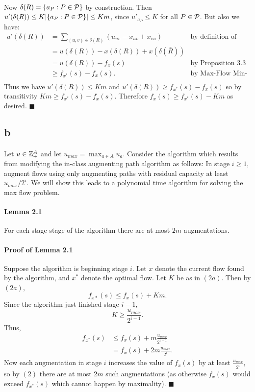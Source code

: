 \documentclass[letterpaper,12pt,oneside,onecolumn]{article}
\begin{document}
\paragraph{}
Now $\delta(R) = \{a_P : P \in \mathcal{P} \}$ by construction. Then $u'(\delta(R)) \leq K|\{a_P : P \in \mathcal{P} \}| \leq Km$, since $u'_{a_P} \leq K$ for all $P \in \mathcal{P}$. But also we have:
\begin{align*}
u'(\delta(R)) &= \sum_{(u,v) \in \delta(R)} (u_{uv} - x_{uv} + x_{vu}) &\text{by definition of residual capacity}\\
&= u(\delta(R)) - x(\delta(R)) + x(\delta(\bar{R})) \\
&= u(\delta(R)) - f_x(s) &\text{by Proposition $3.3$} \\
&\geq f_{x^*}(s) - f_x(s). &\text{by Max-Flow Min-Cut} \\
\end{align*}
Thus we have $u'(\delta(R)) \leq Km$ and $u'(\delta(R)) \geq f_{x^*}(s) - f_x(s)$ so by transitivity $Km \geq f_{x^*}(s) - f_x(s)$. Therefore $f_x(s) \geq f_{x^*}(s) - Km$ as desired. $\blacksquare$
\subsection*{b}
\paragraph{}
Let $u \in \mathbb{Z}_+^A$ and let $u_{max}=\max_{a\in A}u_a$. Consider the algorithm which results from modifying the in-class augmenting path algorithm as follows: In stage $i\geq 1$, augment flows using only augmenting paths with residual capacity at least $u_{max}/2^i$. We will show this leads to a polynomial time algorithm for solving the max flow problem.
\paragraph{Lemma 2.1}
For each stage stage of the algorithm there are at most $2m$ augmentations.
\paragraph{Proof of Lemma 2.1}
Suppose the algorithm is beginning stage $i$. Let $x$ denote the current flow found by the algorithm, and $x^*$ denote the optimal flow. Let $K$ be as in $(2a)$. Then by $(2a)$, $$f_{x*}(s) \leq f_x(s) + Km.$$ Since the algorithm just finished stage $i-1$, $$K \geq \frac{u_{max}}{2^{i-1}}.$$
Thus,
\begin{align}
f_{x^*}(s) &\leq f_x(s) + m\frac{u_{max}}{2^{i-1}} \nonumber\\
&= f_x(s) + 2m\frac{u_{max}}{2^i}. 
\end{align}
Now each augmentation in stage $i$ increases the value of $f_x(s)$ by at least $\frac{u_{max}}{2^i}$, so by $(2)$ there are at most $2m$ such augmentations (as otherwise $f_x(s)$ would exceed $f_{x^*}(s)$ which cannot happen by maximality). $\blacksquare$
\end{document}

